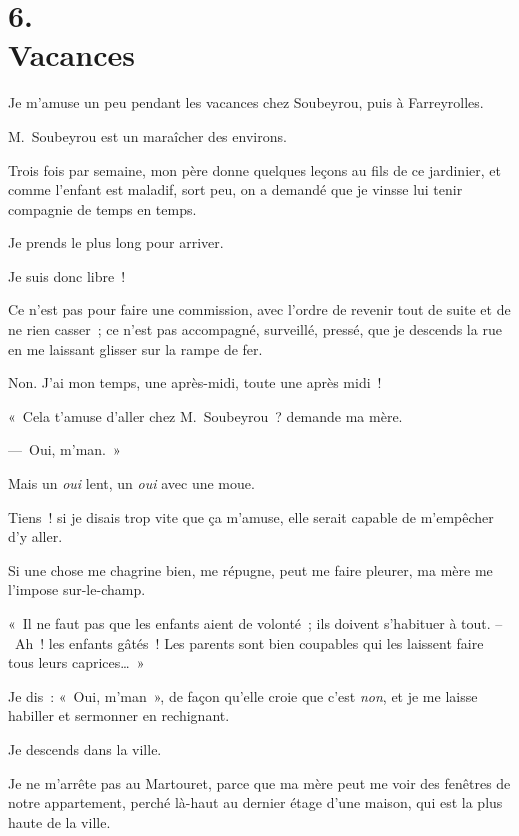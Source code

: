 \documentclass[french,twoside]{book} %
\begin{document}
\section[{6. Vacances}]{6. \\
Vacances}\renewcommand{\leftmark}{6. \\
Vacances}

\noindent Je m’amuse un peu pendant les vacances chez Soubeyrou, puis à Farreyrolles.\par
\bigbreak
\noindent M. Soubeyrou est un maraîcher des environs.\par
Trois fois par semaine, mon père donne quelques leçons au fils de ce jardinier, et comme l’enfant est maladif, sort peu, on a demandé que je vinsse lui tenir compagnie de temps en temps.\par
Je prends le plus long pour arriver.\par
\bigbreak
\noindent Je suis donc libre !\par
\bigbreak
\noindent Ce n’est pas pour faire une commission, avec l’ordre de revenir tout de suite et de ne rien casser ; ce n’est pas accompagné, surveillé, pressé, que je descends la rue en me laissant glisser sur la rampe de fer.\par
Non. J’ai mon temps, une après-midi, toute une après midi !\par
« Cela t’amuse d’aller chez M. Soubeyrou ? demande ma mère.\par
— Oui, m’man. »\par
Mais un \emph{oui} lent, un \emph{oui} avec une moue.\par
Tiens ! si je disais trop vite que ça m’amuse, elle serait capable de m’empêcher d’y aller.\par
Si une chose me chagrine bien, me répugne, peut me faire pleurer, ma mère me l’impose sur-le-champ.\par
« Il ne faut pas que les enfants aient de volonté ; ils doivent s’habituer à tout. – Ah ! les enfants gâtés ! Les parents sont bien coupables qui les laissent faire tous leurs caprices… »\par
Je dis : « Oui, m’man », de façon qu’elle croie que c’est \emph{non}, et je me laisse habiller et sermonner en rechignant.\par
\bigbreak
\noindent Je descends dans la ville.\par
Je ne m’arrête pas au Martouret, parce que ma mère peut me voir des fenêtres de notre appartement, perché là-haut au dernier étage d’une maison, qui est la plus haute de la ville.\par
\end{document}
